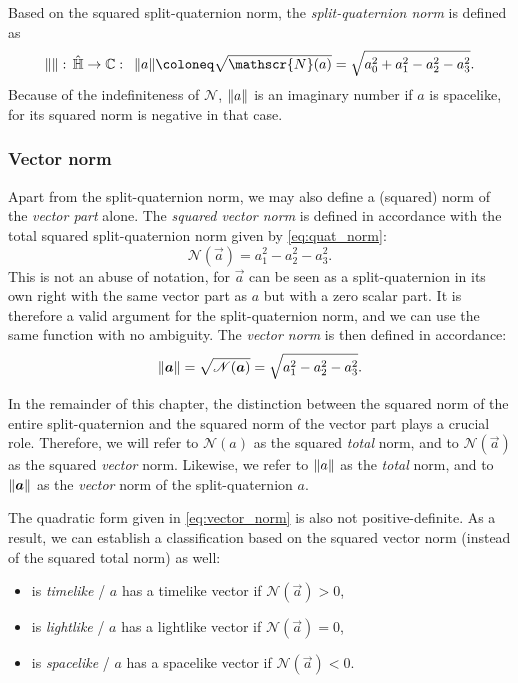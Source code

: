 Based on the squared split-quaternion norm, the \emph{split-quaternion norm} is defined as
\begin{equation}
     \norm{}:\, \spquaternions \to \complex: \;\: \norm{a} \coloneq \sqrt{\mathscr{N}(a)} = \sqrt{a_0^2 + a_1^2 - a_2^2 - a_3^2}.
\end{equation}
Because of the indefiniteness of $\mathscr{N}$, $\norm{a}$ is an imaginary number if $a$ is spacelike, for its squared norm is negative in that case.

\subsubsection{Vector norm}
Apart from the split-quaternion norm, we may also define a (squared) norm of the \emph{vector part} alone. The \emph{squared vector norm} is defined in accordance with the total squared split-quaternion norm given by \cref{eq:quat_norm}:
\begin{equation}
     \mathscr{N}(\vec{a}) = a_1^2 - a^2_2 - a^2_3.
     \label{eq:vector_norm}
\end{equation}
This is not an abuse of notation, for \(\vec{a}\) can be seen as a split-quaternion in its own right with the same vector part as \(a\) but with a zero scalar part. It is therefore a valid argument for the split-quaternion norm, and we can use the same function with no ambiguity. The \emph{vector norm} is then defined in accordance:
\begin{equation}
    \norm{\vec{a}} = \sqrt{\mathscr{N}(\vec{a})} = \sqrt{a_1^2 - a_2^2 - a_3^2}. 
\end{equation}

In the remainder of this chapter, the distinction between the squared norm of the entire split-quaternion and the squared norm of the vector part plays a crucial role. Therefore, we will refer to \(\mathscr{N}(a)\) as the squared \emph{total} norm, and to \(\mathscr{N}(\vec{a})\) as the squared \emph{vector} norm. Likewise, we refer to $\norm{a}$ as the \emph{total} norm, and to $\norm{\vec{a}}$ as the \emph{vector} norm of the split-quaternion $a$.

The quadratic form given in \cref{eq:vector_norm} is also not positive-definite. As a result, we can establish a classification based on the squared vector norm (instead of the squared total norm) as well:
\begin{itemize}
    \item {} is \emph{timelike} / $a$ has a timelike vector if $\mathscr{N}(\vec{a}) > 0$,
    \item {} is \emph{lightlike} / $a$ has a lightlike vector if $\mathscr{N}(\vec{a}) = 0$,
    \item {} is \emph{spacelike} / $a$ has a spacelike vector if $\mathscr{N}(\vec{a}) < 0$.
\end{itemize}

